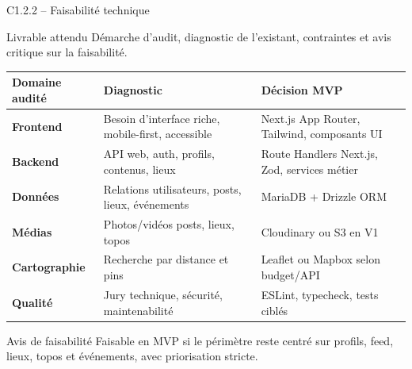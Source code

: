 \documentclass[aspectratio=169,11pt]{beamer}
\newcommand{\competence}[2]{%
  \begin{block}{#1}
    #2
  \end{block}
}
\begin{document}
\begin{frame}[shrink=6]{C1.2.2 -- Faisabilité technique}
  \competence{Livrable attendu}{Démarche d'audit, diagnostic de l'existant, contraintes et avis critique sur la faisabilité.}
  \small
  \begin{tabularx}{\textwidth}{>{\bfseries}p{3.1cm} X X}
    Domaine audité & Diagnostic & Décision MVP \\
    \hline
    Frontend & Besoin d'interface riche, mobile-first, accessible & Next.js App Router, Tailwind, composants UI \\
    Backend & API web, auth, profils, contenus, lieux & Route Handlers Next.js, Zod, services métier \\
    Données & Relations utilisateurs, posts, lieux, événements & MariaDB + Drizzle ORM \\
    Médias & Photos/vidéos posts, lieux, topos & Cloudinary ou S3 en V1 \\
    Cartographie & Recherche par distance et pins & Leaflet ou Mapbox selon budget/API \\
    Qualité & Jury technique, sécurité, maintenabilité & ESLint, typecheck, tests ciblés \\
  \end{tabularx}
  \vspace{0.2cm}
  \begin{block}{Avis de faisabilité}
    Faisable en MVP si le périmètre reste centré sur profils, feed, lieux, topos et événements, avec priorisation stricte.
  \end{block}
\end{frame}
\end{document}
